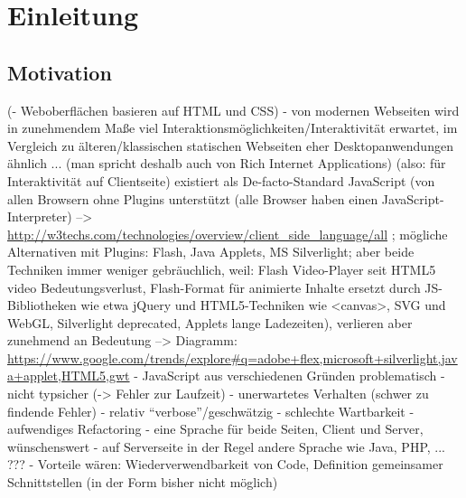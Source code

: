\documentclass[a4paper, 12pt, hidelinks, listof=totoc, listoftables=totoc, bibliography=totoc]{scrreprt}
\begin{document}



\tableofcontents

\newpage

\pagestyle{scrheadings}




\chapter{Einleitung}



\section{Motivation}


(- Weboberflächen basieren auf HTML und CSS)
- von modernen Webseiten wird in zunehmendem Maße viel Interaktionsmöglichkeiten/Interaktivität erwartet, im Vergleich zu älteren/klassischen statischen Webseiten eher Desktopanwendungen ähnlich ... (man spricht deshalb auch von Rich Internet Applications) (also: für Interaktivität auf Clientseite) existiert als De-facto-Standard JavaScript (von allen Browsern ohne Plugins unterstützt (alle Browser haben einen JavaScript-Interpreter)
-->  \url{http://w3techs.com/technologies/overview/client_side_language/all}
; mögliche Alternativen mit Plugins: Flash, Java Applets, MS Silverlight; aber beide Techniken immer weniger gebräuchlich, weil: Flash Video-Player seit HTML5 video Bedeutungsverlust, Flash-Format für animierte Inhalte ersetzt durch JS-Bibliotheken wie etwa jQuery und HTML5-Techniken wie <canvas>, SVG und WebGL, Silverlight deprecated, Applets lange Ladezeiten), verlieren aber zunehmend an Bedeutung  -->  Diagramm:   \url{https://www.google.com/trends/explore#q=adobe+flex,microsoft+silverlight,java+applet,HTML5,gwt}
- JavaScript aus verschiedenen Gründen problematisch
  - nicht typsicher (-> Fehler zur Laufzeit)
  - unerwartetes Verhalten (schwer zu findende Fehler)
  - relativ "`verbose"'/geschwätzig
  - schlechte Wartbarkeit
  - aufwendiges Refactoring
- eine Sprache für beide Seiten, Client und Server, wünschenswert
  - auf Serverseite in der Regel andere Sprache wie Java, PHP, ... ???
  - Vorteile wären: Wiederverwendbarkeit von Code, Definition gemeinsamer Schnittstellen (in der Form bisher nicht möglich)
\end{document}
